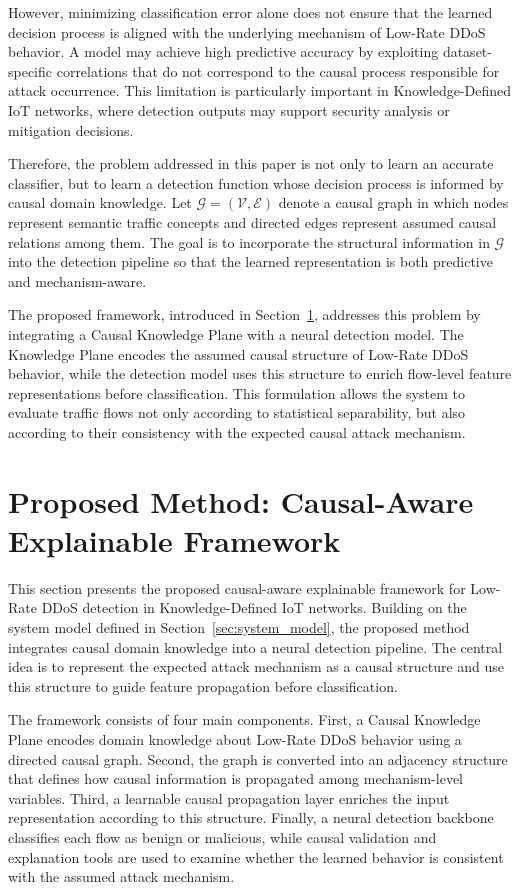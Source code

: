 \documentclass[journal]{IEEEtran}
\begin{document}
However, minimizing classification error alone does not ensure that the learned decision process is aligned with the underlying mechanism of Low-Rate DDoS behavior. A model may achieve high predictive accuracy by exploiting dataset-specific correlations that do not correspond to the causal process responsible for attack occurrence. This limitation is particularly important in Knowledge-Defined IoT networks, where detection outputs may support security analysis or mitigation decisions.

Therefore, the problem addressed in this paper is not only to learn an accurate classifier, but to learn a detection function whose decision process is informed by causal domain knowledge. Let $\mathcal{G} = (\mathcal{V}, \mathcal{E})$ denote a causal graph in which nodes represent semantic traffic concepts and directed edges represent assumed causal relations among them. The goal is to incorporate the structural information in $\mathcal{G}$ into the detection pipeline so that the learned representation is both predictive and mechanism-aware.

The proposed framework, introduced in Section~\ref{sec:proposed_method}, addresses this problem by integrating a Causal Knowledge Plane with a neural detection model. The Knowledge Plane encodes the assumed causal structure of Low-Rate DDoS behavior, while the detection model uses this structure to enrich flow-level feature representations before classification. This formulation allows the system to evaluate traffic flows not only according to statistical separability, but also according to their consistency with the expected causal attack mechanism.

\section{Proposed Method: Causal-Aware Explainable Framework}
\label{sec:proposed_method}

This section presents the proposed causal-aware explainable framework for Low-Rate DDoS detection in Knowledge-Defined IoT networks. Building on the system model defined in Section~\ref{sec:system_model}, the proposed method integrates causal domain knowledge into a neural detection pipeline. The central idea is to represent the expected attack mechanism as a causal structure and use this structure to guide feature propagation before classification.

The framework consists of four main components. First, a Causal Knowledge Plane encodes domain knowledge about Low-Rate DDoS behavior using a directed causal graph. Second, the graph is converted into an adjacency structure that defines how causal information is propagated among mechanism-level variables. Third, a learnable causal propagation layer enriches the input representation according to this structure. Finally, a neural detection backbone classifies each flow as benign or malicious, while causal validation and explanation tools are used to examine whether the learned behavior is consistent with the assumed attack mechanism.
\end{document}
